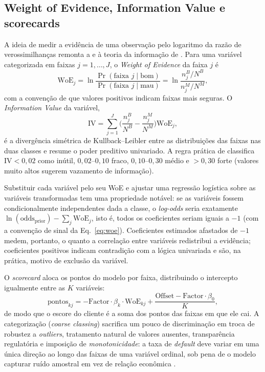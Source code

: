 \documentclass[11pt,a4paper]{article}
\newcommand{\woe}{\mathrm{WoE}}
\newcommand{\iv}{\mathrm{IV}}
\begin{document}
\subsection{Weight of Evidence, Information Value e scorecards}
\label{sec:woe}

A ideia de medir a evidência de uma observação pelo logaritmo da razão de verossimilhanças remonta a \citet{good1950} e à teoria da informação de \citet{kullback1951}. Para uma variável categorizada em faixas $j=1,\dots,J$, o \emph{Weight of Evidence} da faixa $j$ é
\begin{equation}
\woe_j = \ln\frac{\Pr(\text{faixa } j\mid \text{bom})}{\Pr(\text{faixa } j\mid \text{mau})}
= \ln\frac{n_j^{B}/N^{B}}{n_j^{M}/N^{M}},
\label{eq:woe}
\end{equation}
com a convenção de que valores positivos indicam faixas mais seguras. O \emph{Information Value} da variável,
\begin{equation}
\iv = \sum_{j=1}^{J}\Big(\frac{n_j^{B}}{N^{B}}-\frac{n_j^{M}}{N^{M}}\Big)\woe_j ,
\label{eq:iv}
\end{equation}
é a divergência simétrica de Kullback--Leibler entre as distribuições das faixas nas duas classes e resume o poder preditivo univariado. A regra prática de \citet{siddiqi2017} classifica $\iv<0{,}02$ como inútil, $0{,}02$--$0{,}10$ fraco, $0{,}10$--$0{,}30$ médio e $>0{,}30$ forte (valores muito altos sugerem vazamento de informação).

Substituir cada variável pelo seu WoE e ajustar uma regressão logística sobre as variáveis transformadas tem uma propriedade notável: se as variáveis fossem condicionalmente independentes dada a classe, o \emph{log-odds} seria exatamente $\ln(\mathrm{odds}_{\text{prior}})-\sum_j \woe_j$, isto é, todos os coeficientes seriam iguais a $-1$ (com a convenção de sinal da Eq.~\ref{eq:woe}). Coeficientes estimados afastados de $-1$ medem, portanto, o quanto a correlação entre variáveis redistribui a evidência; coeficientes positivos indicam contradição com a lógica univariada e são, na prática, motivo de exclusão da variável.

O \emph{scorecard} aloca os pontos do modelo por faixa, distribuindo o intercepto igualmente entre as $K$ variáveis:
\begin{equation}
\text{pontos}_{kj} = -\mathrm{Factor}\cdot\beta_k\cdot\woe_{kj} + \frac{\mathrm{Offset}-\mathrm{Factor}\cdot\beta_0}{K},
\label{eq:pontos}
\end{equation}
de modo que o escore do cliente é a soma dos pontos das faixas em que ele cai. A categorização (\emph{coarse classing}) sacrifica um pouco de discriminação em troca de robustez a \emph{outliers}, tratamento natural de valores ausentes, transparência regulatória e imposição de \emph{monotonicidade}: a taxa de \emph{default} deve variar em uma única direção ao longo das faixas de uma variável ordinal, sob pena de o modelo capturar ruído amostral em vez de relação econômica \citep{zeng2014,siddiqi2017}.
\end{document}
